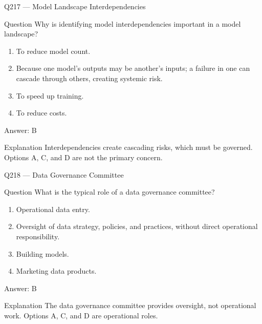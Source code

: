 \documentclass[aspectratio=169,8pt]{beamer}
\begin{document}
\begin{frame}{Q217 --- Model Landscape Interdependencies}
\begin{block}{Question}
Why is identifying model interdependencies important in a model landscape?
\begin{enumerate}
\item To reduce model count.
\item Because one model's outputs may be another's inputs; a failure in one can cascade through others, creating systemic risk.
\item To speed up training.
\item To reduce costs.
\end{enumerate}  \end{block}
\begin{exampleblock}{Answer: B}\end{exampleblock}
\begin{block}{Explanation}
Interdependencies create cascading risks, which must be governed. Options A, C, and D are not the primary concern.
\end{block}
\end{frame}

\begin{frame}{Q218 --- Data Governance Committee}
\begin{block}{Question}
What is the typical role of a data governance committee?
\begin{enumerate}
\item Operational data entry.
\item Oversight of data strategy, policies, and practices, without direct operational responsibility.
\item Building models.
\item Marketing data products.
\end{enumerate}  \end{block}
\begin{exampleblock}{Answer: B}\end{exampleblock}
\begin{block}{Explanation}
The data governance committee provides oversight, not operational work. Options A, C, and D are operational roles.
\end{block}
\end{frame}
\end{document}
